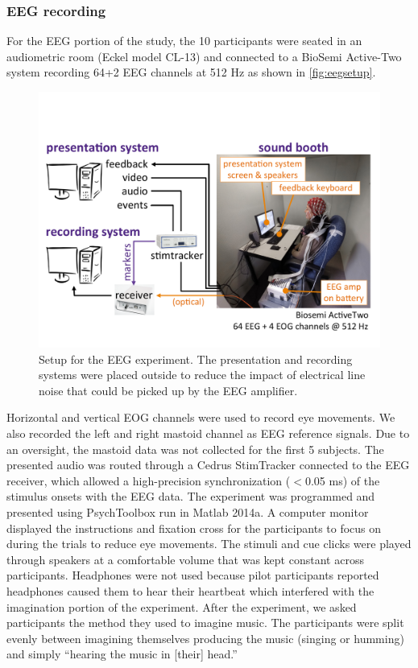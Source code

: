 \subsubsection*{EEG recording}
For the EEG portion of the study, the 10 participants were seated in an audiometric room (Eckel model CL-13) and connected to a BioSemi Active-Two system recording 64+2 EEG channels at 512 Hz as shown in \autoref{fig:eegsetup}.
\begin{figure}
  \begin{center}
    \includegraphics[width=\columnwidth,keepaspectratio=true]{Figures/EEG-setup.pdf}
    \caption{%
Setup for the EEG experiment.
The presentation and recording systems were placed outside to reduce the impact of electrical line noise that could be picked up by the EEG amplifier.
}
    \label{fig:eegsetup}
  \end{center}
\end{figure}
Horizontal and vertical EOG channels were used to record eye movements. 
We also recorded the left and right mastoid channel as EEG reference signals. 
Due to an oversight, the mastoid data was not collected for the first 5 subjects.
The presented audio %
was routed through a Cedrus StimTracker connected to the EEG receiver, which allowed a high-precision synchronization ($<$0.05 ms) of the stimulus onsets with the \ac{EEG} data.
The experiment was programmed and presented using PsychToolbox run in Matlab 2014a. 
A computer monitor displayed the instructions and fixation cross for the participants to focus on during the trials to reduce eye movements.
The stimuli and cue clicks were played through speakers at a comfortable volume that was kept constant across participants. Headphones were not used because pilot participants reported headphones caused them to hear their heartbeat which interfered with the imagination portion of the experiment. 
After the experiment, we asked participants the method they used to imagine music. 
The participants were split evenly between imagining themselves producing the music (singing or humming) and simply ``hearing the music in [their] head.'' 

